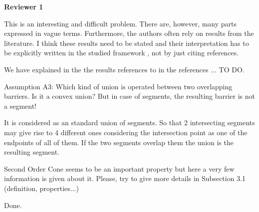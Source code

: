 \documentclass{article}
\newenvironment{reviewer}{\setcounter{pointcounter}{1}}{}
\newcommand{\point}{\text{{\selectfont \thepointcounter} \stepcounter{pointcounter}}}
\begin{document}
	\begin{reviewer}
		
		\begin{tcolorbox}[breakable,enhanced,coltitle=black,colback=red!75!black,colframe=red!75!black,borderline={1pt}{0pt}{black},boxrule=0pt]
			\textbf{Reviewer 1}
		\end{tcolorbox}
		
		\begin{itshape}
			This is an interesting and difficult problem. There are, however, many parts
			expressed in vague terms. Furthermore, the authors often rely on results from the
			literature. I think these results need to be stated and their interpretation has to be
			explicitly written in the studied framework , not by just citing references.
		\end{itshape}
		
		\begin{tcolorbox}[breakable,enhanced,coltitle=black,colback=red!5!white,colframe=red!75!black,title=\textbf{Answer R1.\point},borderline={1pt}{0pt}{black},boxrule=0pt]
	We have explained in the the results references to in the references ... TO DO.
		\end{tcolorbox}
		
		\begin{itshape}
			Assumption A3: Which kind of union is operated between two overlapping barriers. Is it a convex union? But in case of segments, the resulting barrier is not a segment!
		\end{itshape}
		
		\begin{tcolorbox}[breakable,enhanced,coltitle=black,colback=red!5!white,colframe=red!75!black,title=\textbf{Answer R1.\point},borderline={1pt}{0pt}{black},boxrule=0pt]
		It is considered as an standard union of segments. So that 2 intersecting segments may give rise to 4 different ones considering the intersection point as one of the  endpoints of all of them. If the two segments overlap them the union is the resulting segment.
		\end{tcolorbox}
		
		\begin{itshape}
			Second Order Cone seems to be an important property but here a very few information is given about it. Please, try to give more details in Subsection 3.1 (definition, properties...)
		\end{itshape}
		
		\begin{tcolorbox}[breakable,enhanced,coltitle=black,colback=red!5!white,colframe=red!75!black,title=\textbf{Answer R1.\point},borderline={1pt}{0pt}{black},boxrule=0pt]
			Done.
		\end{tcolorbox}
		

\end{reviewer}
\end{document}
